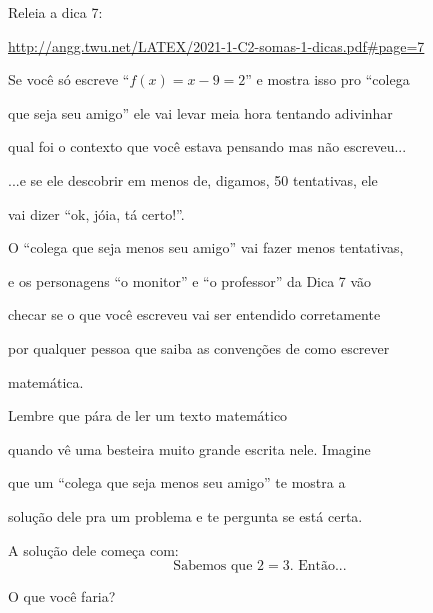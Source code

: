 \documentclass[oneside,12pt]{article}
\begin{document}
\bsk

Releia a dica 7:


{\footnotesize

\url{http://angg.twu.net/LATEX/2021-1-C2-somas-1-dicas.pdf#page=7}

}


Se você só escreve ``$f(x) = x-9 = 2$'' e mostra isso pro ``colega

que seja seu amigo'' ele vai levar meia hora tentando adivinhar

qual foi o contexto que você estava pensando mas não escreveu...


\newpage


...e se ele descobrir em menos de, digamos, 50 tentativas, ele

vai dizer ``ok, jóia, tá certo!''.

\msk

O ``colega que seja menos seu amigo'' vai fazer menos tentativas,

e os personagens ``o monitor'' e ``o professor'' da Dica 7 vão

checar se o que você escreveu vai ser entendido corretamente

por qualquer pessoa que saiba as convenções de como escrever

matemática.

\msk

Lembre que  pára de ler um texto matemático

quando vê uma besteira muito grande escrita nele. Imagine

que um ``colega que seja menos seu amigo'' te mostra a

solução dele pra um problema e te pergunta se está certa.

A solução dele começa com:
%
$$\text{Sabemos que $2=3$. Então...}$$

O que você faria?

\newpage
\end{document}
